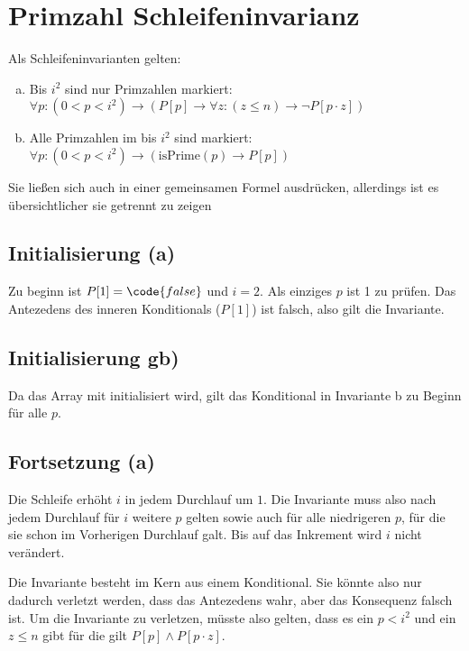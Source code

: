 \documentclass[parskip=half,a4paper]{scrartcl}
\begin{document}
\section*{Primzahl Schleifeninvarianz}

Als Schleifeninvarianten gelten:

\begin{enumerate}[a)]
	\item Bis $i^2$ sind nur Primzahlen markiert: $\forall p: \left(0 < p < i^2\right) \rightarrow \left(P[p] \rightarrow \forall z: \left(z \le n\right) \rightarrow
	\neg P[p \cdot z]\right)$

	\item Alle Primzahlen im bis $i^2$ sind markiert: $\forall p: \left(0 < p < i^2\right) \rightarrow \left(\text{isPrime}\left(p\right) \rightarrow P[p]\right)$
\end{enumerate}

Sie ließen sich auch in einer gemeinsamen Formel ausdrücken, allerdings ist es übersichtlicher sie getrennt zu zeigen

\subsection*{Initialisierung (a)}

Zu beginn ist $P[1] = \code{false}$ und $i = 2$. Als einziges $p$ ist 1 zu prüfen. Das Antezedens des inneren Konditionals ($P[1]$) ist falsch, also gilt die Invariante.

\subsection*{Initialisierung gb)}

Da das Array mit  initialisiert wird, gilt das Konditional in Invariante b zu Beginn für alle $p$.

\subsection*{Fortsetzung (a)}

Die Schleife erhöht $i$ in jedem Durchlauf um $1$. Die Invariante muss also nach jedem Durchlauf für $i$ weitere $p$ gelten sowie auch für alle niedrigeren $p$, für die sie schon im Vorherigen Durchlauf galt. Bis auf das Inkrement wird $i$ nicht verändert.

Die Invariante besteht im Kern aus einem Konditional. Sie könnte also nur dadurch verletzt werden, dass das Antezedens wahr, aber das Konsequenz falsch ist. Um die Invariante zu verletzen, müsste also gelten, dass es ein $p < i^2$ und ein $z \le n$ gibt für die gilt $P[p] \land P[p \cdot z]$.
\end{document}
